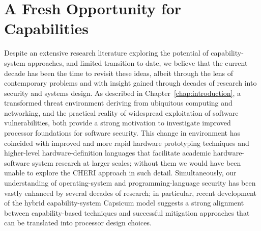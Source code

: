 \section{A Fresh Opportunity for Capabilities} %

Despite an extensive research literature exploring the potential of
capability-system approaches, and limited transition to date, we believe
that the current decade has been the time to revisit these
ideas, albeit through the lens of contemporary problems and with insight gained through decades of research into security and systems design.
As described in Chapter~\ref{chap:introduction}, a transformed threat
environment deriving from ubiquitous computing and networking, and the
practical reality of  widespread exploitation of software vulnerabilities,
both
provide a strong motivation to investigate improved processor foundations for
software security.
This change in environment has coincided with improved
and more rapid
hardware prototyping
techniques and higher-level hardware-definition languages that facilitate
academic hardware-software system research at larger scales; without them we
would have been unable to explore the CHERI approach in such detail.
Simultaneously, our understanding of operating-system and programming-language
security has been vastly enhanced by several decades of research;
in particular, recent
development of the hybrid capability-system Capsicum model suggests a strong alignment between
capability-based techniques and successful mitigation approaches that can be
translated into processor design choices.


